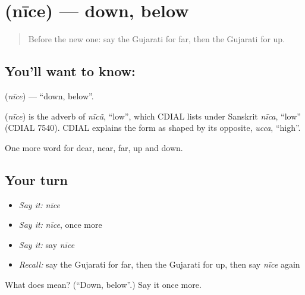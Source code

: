 \section[\texorpdfstring{\gu{નીચે} (nīce)}{નીચે (nīce)}]{ (nīce) — down, below}

\label{lesson:GU-C74-down}



\begin{quote}
Before the new one: say the Gujarati for far, then the Gujarati for up.
\end{quote}

\subsection*{You'll want to know: }
\textbf{} (\emph{nīce}) — \textquotedblleft{}down, below\textquotedblright{}.

\begin{cousinweb}
\textbf{} (\emph{nīce}) is the adverb of \emph{nīcũ}, \textquotedblleft{}low\textquotedblright{}, which CDIAL lists under Sanskrit \emph{nīca}, \textquotedblleft{}low\textquotedblright{} (CDIAL 7540). CDIAL explains the form as shaped by its opposite, \emph{ucca}, \textquotedblleft{}high\textquotedblright{}.
\end{cousinweb}

\begin{grammarlens}[title={What you've built}]
One more word for dear, near, far, up and down.
\end{grammarlens}

\subsection*{Your turn}
\begin{itemize}
\raggedright
  \item \emph{Say it:} \emph{nīce}
  \item \emph{Say it:} \emph{nīce}, once more
  \item \emph{Say it:} say \emph{nīce}
  \item \emph{Recall:} say the Gujarati for far, then the Gujarati for up, then say \emph{nīce} again
\end{itemize}

\begin{tcolorbox}[breakable,colback=teal!4,colframe=teal!35!black,title={Before you move on}]
What does  mean? (\textquotedblleft{}Down, below\textquotedblright{}.) Say it once more.
\end{tcolorbox}
